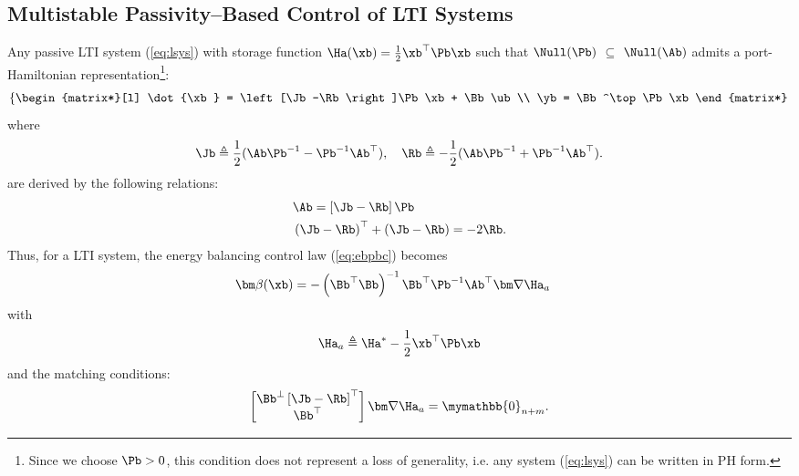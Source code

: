 %
\subsection{Multistable Passivity--Based Control of LTI Systems}
%
Any passive LTI system (\ref{eq:lsys}) with storage function $\Ha(\xb) = \frac{1}{2}\xb^\top \Pb\xb$ such that $\Null(\Pb)$ $\subseteq$ $\Null(\Ab)$ admits a port-Hamiltonian representation\footnote{Since we choose $\Pb>0$, this condition does not represent a loss of generality, i.e. any system (\ref{eq:lsys}) can be written in PH form.}:
%
\begin{equation}
    \left\{
    \begin{matrix*}[l]
    \dot{\xb} = \left[\Jb-\Rb\right]\Pb\xb + \Bb\ub\\
    \yb = \Bb^\top \Pb\xb
    \end{matrix*}
    \right.
\end{equation}
%
where 
%
\begin{equation}
    \Jb \triangleq \frac{1}{2}(\Ab\Pb^{-1}-\Pb^{-1}\Ab^\top),\quad\Rb \triangleq- \frac{1}{2}(\Ab\Pb^{-1}+\Pb^{-1}\Ab^\top).
\end{equation}
% 
are derived by the following relations:
%
\begin{align}
    & \Ab = \left[\Jb-\Rb\right]\Pb\\
    & \left(\Jb-\Rb\right)^\top + \left(\Jb-\Rb\right) = -2\Rb.
\end{align}
%
Thus, for a LTI system, the energy balancing control law (\ref{eq:ebpbc}) becomes 
%
\begin{align}\label{eq:multiebpbc_lin}
    \bm\beta(\xb) &= -\left(\Bb^\top\Bb\right)^{-1}\Bb^\top\Pb^{-1}\Ab^\top\bm\nabla\Ha_a
\end{align}
%
with
%
\begin{equation}
    \Ha_a\triangleq\Ha^*-\frac{1}{2}\xb^\top \Pb\xb
\end{equation}
%
and the matching conditions:
%
\begin{equation}\label{eq:match_lin}
    \begin{bmatrix}
        {\Bb}^{\perp}\left[\Jb-\Rb\right]^\top\\
        {\Bb}^\top
    \end{bmatrix}
    \bm\nabla\Ha_a =\mymathbb{0}_{n+m}.
\end{equation}
